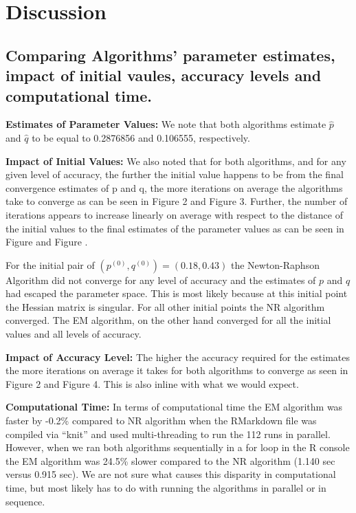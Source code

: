 \documentclass[]{article}
\begin{document}
\section{Discussion}\label{discussion}

\subsection{Comparing Algorithms' parameter estimates, impact of initial
vaules, accuracy levels and computational
time.}\label{comparing-algorithms-parameter-estimates-impact-of-initial-vaules-accuracy-levels-and-computational-time.}

\textbf{Estimates of Parameter Values:} We note that both algorithms
estimate \(\hat{p}\) and \(\hat{q}\) to be equal to 0.2876856 and
0.106555, respectively.

\textbf{Impact of Initial Values:} We also noted that for both
algorithms, and for any given level of accuracy, the further the initial
value happens to be from the final convergence estimates of p and q, the
more iterations on average the algorithms take to converge as can be
seen in Figure 2 and Figure 3. Further, the number of iterations appears
to increase linearly on average with respect to the distance of the
initial values to the final estimates of the parameter values as can be
seen in Figure and Figure .

For the initial pair of \((p^{(0)}, q^{(0)}) = (0.18, 0.43)\) the
Newton-Raphson Algorithm did not converge for any level of accuracy and
the estimates of \(p\) and \(q\) had escaped the parameter space. This
is most likely because at this initial point the Hessian matrix is
singular. For all other initial points the NR algorithm converged. The
EM algorithm, on the other hand converged for all the initial values and
all levels of accuracy.

\textbf{Impact of Accuracy Level:} The higher the accuracy required for
the estimates the more iterations on average it takes for both
algorithms to converge as seen in Figure 2 and Figure 4. This is also
inline with what we would expect.

\textbf{Computational Time:} In terms of computational time the EM
algorithm was faster by -0.2\% compared to NR algorithm when the
RMarkdown file was compiled via ``knit'' and used multi-threading to run
the 112 runs in parallel. However, when we ran both algorithms
sequentially in a for loop in the R console the EM algorithm was 24.5\%
slower compared to the NR algorithm (1.140 sec versus 0.915 sec). We are
not sure what causes this disparity in computational time, but most
likely has to do with running the algorithms in parallel or in sequence.
\end{document}
